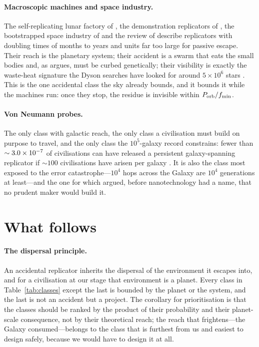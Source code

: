 \documentclass[11pt]{article}
\begin{document}
\paragraph{Macroscopic machines and space industry.}  The self-replicating
lunar factory of \citet{Freitas1980b}, the demonstration replicators of
\citet{Zykov2005}, the bootstrapped space industry of \citet{Metzger2013} and
the review of \citet{Moses2020} describe replicators with doubling times of
months to years and units far too large for passive escape.  Their reach is
the planetary system; their accident is a swarm that eats the small bodies
and, as \citet{Ellery2022b} argues, must be curbed genetically; their
visibility is exactly the waste-heat signature the Dyson searches have looked
for around $5\times10^{6}$ stars \citep{Suazo2024}.  This is the one accidental
class the sky already bounds, and it bounds it while the machines run: once
they stop, the residue is invisible within $P_{\rm orb}/f_{\min}$.

\paragraph{Von Neumann probes.}  The only class with galactic reach, the only
class a civilisation must build on purpose to travel, and the only class the
$10^{5}$-galaxy record constrains: fewer than $\sim3.0\times10^{-7}$ of
civilisations can have released a persistent galaxy-spanning replicator if
$\sim100$ civilisations have arisen per galaxy \citep{GooPaper}.  It is also
the class most exposed to the error catastrophe---$10^{4}$ hops across the
Galaxy are $10^{4}$ generations at least---and the one for which
\citet{SaganNewman1983} argued, before nanotechnology had a name, that no
prudent maker would build it.

\section{What follows}

\paragraph{The dispersal principle.}  An accidental replicator inherits the
dispersal of the environment it escapes into, and for a civilisation at our
stage that environment is a planet.  Every class in Table~\ref{tab:classes}
except the last is bounded by the planet or the system, and the last is not
an accident but a project.  The corollary for prioritisation is that the
classes should be ranked by the product of their probability and their
planet-scale consequence, not by their theoretical reach; the reach that
frightens---the Galaxy consumed---belongs to the class that is furthest from
us and easiest to design safely, because we would have to design it at all.
\end{document}
